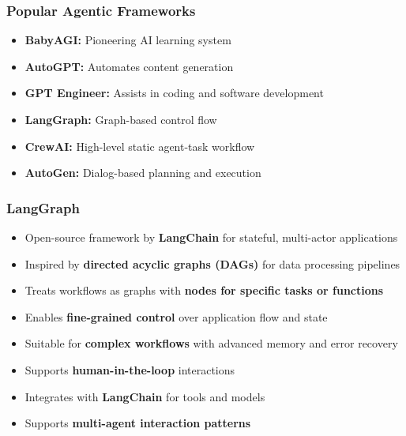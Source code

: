 \begin{frame}[fragile]\frametitle{Popular Agentic Frameworks}
\begin{itemize}
    \item \textbf{BabyAGI:} Pioneering AI learning system
    \item \textbf{AutoGPT:} Automates content generation
    \item \textbf{GPT Engineer:} Assists in coding and software development
    \item \textbf{LangGraph:} Graph-based control flow
    \item \textbf{CrewAI:} High-level static agent-task workflow
    \item \textbf{AutoGen:} Dialog-based planning and execution
\end{itemize}
\end{frame}

\begin{frame}[fragile]\frametitle{LangGraph}
\begin{itemize}
    \item Open-source framework by \textbf{LangChain} for stateful, multi-actor applications
    \item Inspired by \textbf{directed acyclic graphs (DAGs)} for data processing pipelines
    \item Treats workflows as graphs with \textbf{nodes for specific tasks or functions}
    \item Enables \textbf{fine-grained control} over application flow and state
    \item Suitable for \textbf{complex workflows} with advanced memory and error recovery
    \item Supports \textbf{human-in-the-loop} interactions
    \item Integrates with \textbf{LangChain} for tools and models
    \item Supports \textbf{multi-agent interaction patterns}
\end{itemize}
\end{frame}

